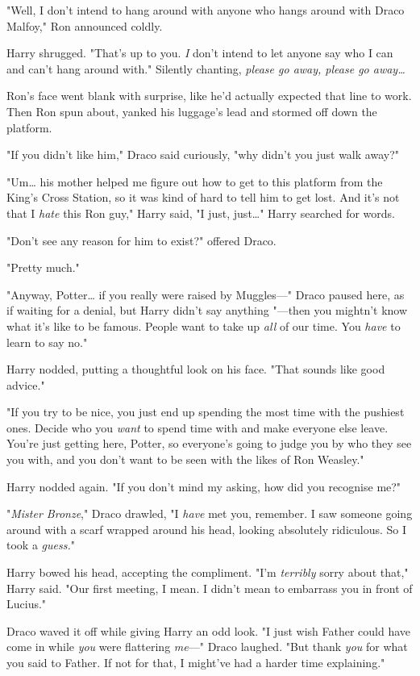"Well, I don't intend to hang around with anyone who hangs around with Draco
Malfoy," Ron announced coldly.

Harry shrugged. "That's up to you. \emph{I} don't intend to let anyone say who
I can and can't hang around with." Silently chanting, \emph{please go away,
please go away{\ldots}}

Ron's face went blank with surprise, like he'd actually expected that line to
work. Then Ron spun about, yanked his luggage's lead and stormed off down the
platform.

"If you didn't like him," Draco said curiously, "why didn't you just walk away?"

"Um{\ldots} his mother helped me figure out how to get to this platform from
the King's Cross Station, so it was kind of hard to tell him to get lost. And
it's not that I \emph{hate} this Ron guy," Harry said, "I just, just{\ldots}"
Harry searched for words.

"Don't see any reason for him to exist?" offered Draco.

"Pretty much."

"Anyway, Potter{\ldots} if you really were raised by Muggles---" Draco paused
here, as if waiting for a denial, but Harry didn't say anything "---then you
mightn't know what it's like to be famous. People want to take up \emph{all} of
our time. You \emph{have} to learn to say no."

Harry nodded, putting a thoughtful look on his face. "That sounds like good
advice."

"If you try to be nice, you just end up spending the most time with the
pushiest ones. Decide who you \emph{want} to spend time with and make everyone
else leave. You're just getting here, Potter, so everyone's going to judge you
by who they see you with, and you don't want to be seen with the likes of Ron
Weasley."

Harry nodded again. "If you don't mind my asking, how did you recognise me?"

"\emph{Mister Bronze}," Draco drawled, "I \emph{have} met you, remember. I saw
someone going around with a scarf wrapped around his head, looking absolutely
ridiculous. So I took a \emph{guess.}"

Harry bowed his head, accepting the compliment. "I'm \emph{terribly} sorry
about that," Harry said. "Our first meeting, I mean. I didn't mean to embarrass
you in front of Lucius."

Draco waved it off while giving Harry an odd look. "I just wish Father could
have come in while \emph{you} were flattering \emph{me}---" Draco laughed. "But
thank \emph{you} for what you said to Father. If not for that, I might've had a
harder time explaining."

